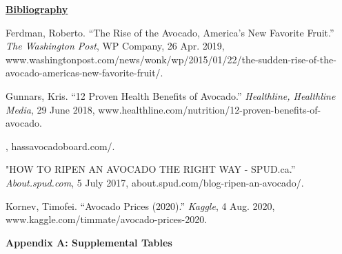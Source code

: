 \documentclass[11pt]{article}\usepackage[]{graphicx}\usepackage[]{color}
\begin{document}
\clearpage
\noindent\textbf{\underline{Bibliography}}
\hfill \break

\noindent [1] Ferdman, Roberto. “The Rise of the Avocado, America's New Favorite Fruit.” {\em The Washington Post}, WP Company, 26 Apr. 2019, www.washingtonpost.com/news/wonk/wp/2015/01/22/the-sudden-rise-of-the-avocado-americas-new-favorite-fruit/. 

\noindent [2] Gunnars, Kris. “12 Proven Health Benefits of Avocado.” {\em Healthline, Healthline Media}, 29 June 2018, www.healthline.com/nutrition/12-proven-benefits-of-avocado. 

, hassavocadoboard.com/. 

\noindent [4] "HOW TO RIPEN AN AVOCADO THE RIGHT WAY - SPUD.ca.” {\em About.spud.com}, 5 July 2017, about.spud.com/blog-ripen-an-avocado/. 

\noindent [5] Kornev, Timofei. “Avocado Prices (2020).” {\em Kaggle}, 4 Aug. 2020, www.kaggle.com/timmate/avocado-prices-2020. 


\hfill \break


\clearpage
\newpage
\noindent \Large{{\bf Appendix A: Supplemental Tables}}
\end{document}
